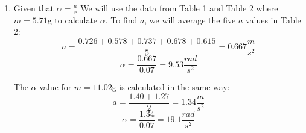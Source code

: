 \documentclass[10pt, letterpaper]{article}
\begin{document}
\begin{enumerate}
  \item Given that $\alpha = \frac{a}{r}$
      We will use the data from Table 1 and Table 2 where $m = 5.71$g to calculate $\alpha $. To find $a$, we will average the five $a$ values in Table 2: \\[3]
      \[ a = \frac{0.726 + 0.578 + 0.737 + 0.678 + 0.615}{5} = 0.667 \frac{m}{s^2} \]
      \[\alpha = \frac{0.667}{0.07} = \boxed{9.53 \frac{rad}{s^2}} \]

      The $\alpha $ value for $m = 11.02$g is calculated in the same way: \\[3]
      \[ a = \frac{1.40 + 1.27}{2} = 1.34 \frac{m}{s^2} \]
      \[\alpha = \frac{1.34}{0.07} = \boxed{19.1 \frac{rad}{s^2}} \]


\end{enumerate}
\end{document}
